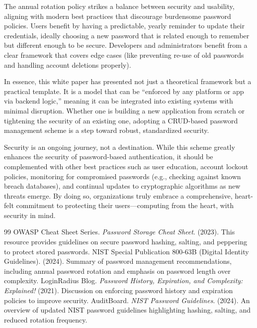 \documentclass[11pt]{article}
\begin{document}
The annual rotation policy strikes a balance between security and usability, aligning with modern best practices that discourage burdensome password policies. Users benefit by having a predictable, yearly reminder to update their credentials, ideally choosing a new password that is related enough to remember but different enough to be secure. Developers and administrators benefit from a clear framework that covers edge cases (like preventing re-use of old passwords and handling account deletions properly).

In essence, this white paper has presented not just a theoretical framework but a practical template. It is a model that can be ``enforced by any platform or app via backend logic,'' meaning it can be integrated into existing systems with minimal disruption. Whether one is building a new application from scratch or tightening the security of an existing one, adopting a CRUD-based password management scheme is a step toward robust, standardized security.

Security is an ongoing journey, not a destination. While this scheme greatly enhances the security of password-based authentication, it should be complemented with other best practices such as user education, account lockout policies, monitoring for compromised passwords (e.g., checking against known breach databases), and continual updates to cryptographic algorithms as new threats emerge. By doing so, organizations truly embrace a comprehensive, heart-felt commitment to protecting their users—computing from the heart, with security in mind.

\newpage
\begin{thebibliography}{99}
 OWASP Cheat Sheet Series. \textit{Password Storage Cheat Sheet}. (2023). This resource provides guidelines on secure password hashing, salting, and peppering to protect stored passwords.
 NIST Special Publication 800-63B (Digital Identity Guidelines). (2024). Summary of password management recommendations, including annual password rotation and emphasis on password length over complexity.
 LoginRadius Blog. \textit{Password History, Expiration, and Complexity: Explained!} (2021). Discussion on enforcing password history and expiration policies to improve security.
 AuditBoard. \textit{NIST Password Guidelines}. (2024). An overview of updated NIST password guidelines highlighting hashing, salting, and reduced rotation frequency.
\end{thebibliography}
\end{document}
